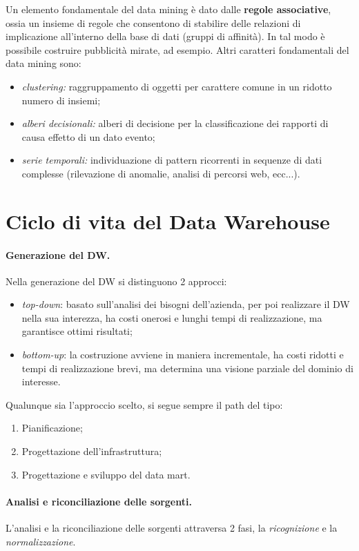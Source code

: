 \documentclass[a4paper, 10pt]{article}
\begin{document}
	Un elemento fondamentale del data mining è dato dalle \textbf{regole associative}, ossia un insieme di regole che consentono di stabilire delle relazioni di implicazione all'interno della base di dati (gruppi di affinità). In tal modo è possibile costruire pubblicità mirate, ad esempio.
	Altri caratteri fondamentali del data mining sono:\begin{itemize}
		\item \textit{clustering:} raggruppamento di oggetti per carattere comune in un ridotto numero di insiemi;
		\item \textit{alberi decisionali:} alberi di decisione per la classificazione dei rapporti di causa effetto di un dato evento;
		\item \textit{serie temporali:} individuazione di pattern ricorrenti in sequenze di dati complesse (rilevazione di anomalie, analisi di percorsi web, ecc...).
	\end{itemize}

	\section{Ciclo di vita del Data Warehouse}
	
	\paragraph{Generazione del DW.} Nella generazione del DW si distinguono 2 approcci: \begin{itemize}
		\item \textit{top-down}: basato sull'analisi dei bisogni dell'azienda, per poi realizzare il DW nella sua interezza, ha costi onerosi e lunghi tempi di realizzazione, ma garantisce ottimi risultati;
		\item \textit{bottom-up}: la costruzione avviene in maniera incrementale, ha costi ridotti e tempi di realizzazione brevi, ma determina una visione parziale del dominio di interesse.
	\end{itemize}

	Qualunque sia l'approccio scelto, si segue sempre il path del tipo: \begin{enumerate}
		\item Pianificazione;
		\item Progettazione dell'infrastruttura;
		\item Progettazione e sviluppo del data mart.
	\end{enumerate}

	\paragraph{Analisi e riconciliazione delle sorgenti.} L'analisi e la riconciliazione delle sorgenti attraversa 2 fasi, la \textit{ricognizione} e la \textit{normalizzazione}.
	
\end{document}
